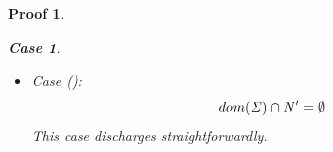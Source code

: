 \documentclass[showabstract,showacknowledgments,showpreface,showdedication]{iuphd}
\newtheorem*{bcase}{Case}
\theoremstyle{nonumberplain}
\newtheorem{nproof}{Proof}
\begin{document}
\begin{nproof}
\begin{bcase}
\begin{itemize}
\begin{itemize}
\begin{align*}
      \storewfca{\AENV'}{\NENV}{\MENV}{\STOR}
      \end{align*}
      Of the requirements in this judgement, the only one that is affected by the
      new environment $\AENV'$ is requirement
      .
      The specific obligation is to establish that,
      for each $(\reg \mapsto \emptyset) \in \AENV'$, it
      is the case that $\reg \not \in dom(\STOR)$.
      By inversion on \tlregion{},
      $\AENV' = \AENV \cup \set{\reg \mapsto \emptyset}$, and therefore,
      the first part of the obligation, that is, for $\AENV$, is already
      given by the premise of this lemma.
      As such, it only remains to establish that $\reg \not \in dom(\STOR)$,
      which follows from $\reg$ being a fresh region, thereby ruling out
      it being in the store, and thus discharging this case.
      \item
      Case ():
      \begin{displaymath}
      dom(\mathit{\Sigma}) \cap \mathit{N}' = \emptyset
      \end{displaymath}
      This case discharges straightforwardly.
      \end{itemize}
    \end{itemize}
  \end{bcase}


\end{nproof}
\end{document}
